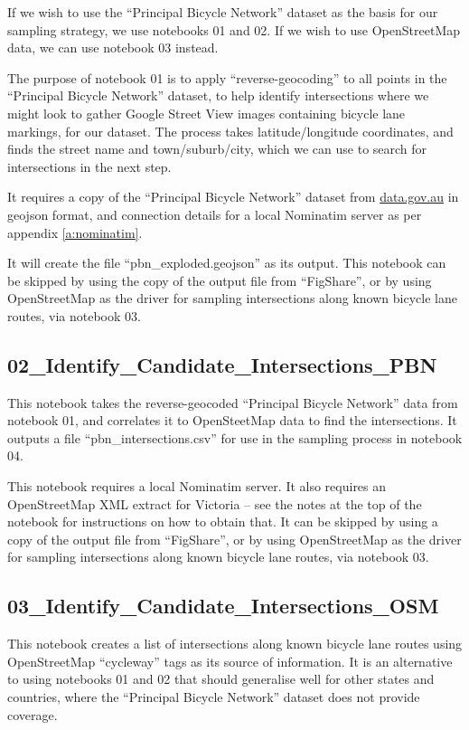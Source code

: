 \documentclass[11pt,twoside]{report}
\begin{document}
If we wish to use the ``Principal Bicycle Network'' dataset as the basis for our sampling strategy, we use notebooks 01 and 02.  If we wish to use OpenStreetMap data, we can use notebook 03 instead.

The purpose of notebook 01 is to apply ``reverse-geocoding'' to all points in the ``Principal Bicycle Network'' dataset, to help identify intersections where we might look to gather Google Street View images containing bicycle lane markings, for our dataset.  The process takes latitude/longitude coordinates, and finds the street name and town/suburb/city, which we can use to search for intersections in the next step.

It requires a copy of the ``Principal Bicycle Network'' dataset from \url{data.gov.au} in geojson format, and connection details for a local Nominatim server as per appendix \ref{a:nominatim}.

It will create the file ``pbn\_exploded.geojson'' as its output.  This notebook can be skipped by using the copy of the output file from ``FigShare'', or by using OpenStreetMap as the driver for sampling intersections along known bicycle lane routes, via notebook 03.


\subsection{02\_Identify\_Candidate\_Intersections\_PBN}
\label{aj02}

This notebook takes the reverse-geocoded ``Principal Bicycle Network'' data from notebook 01, and correlates it to OpenSteetMap data to find the intersections.  It outputs a file ``pbn\_intersections.csv'' for use in the sampling process in notebook 04.

This notebook requires a local Nominatim server.  It also requires an OpenStreetMap XML extract for Victoria -- see the notes at the top of the notebook for instructions on how to obtain that.  It can be skipped by using a copy of the output file from ``FigShare'', or by using OpenStreetMap as the driver for sampling intersections along known bicycle lane routes, via notebook 03.


\subsection{03\_Identify\_Candidate\_Intersections\_OSM}
\label{aj03}

This notebook creates a list of intersections along known bicycle lane routes using OpenStreetMap ``cycleway'' tags as its source of information.  It is an alternative to using notebooks 01 and 02 that should generalise well for other states and countries, where the ``Principal Bicycle Network'' dataset does not provide coverage.
\end{document}
